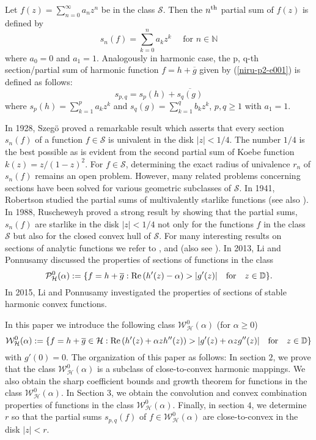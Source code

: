 \documentclass[a4paper,12pt]{amsart}
\theoremstyle{plain}
\theoremstyle{definition}
\begin{document}
Let  $f(z)=\sum_{n=0}^\infty a_nz^n$  be in the class $\mathcal{S}$. Then  the $n^{\rm th}$ partial sum of $f(z)$ is defined by
$$s_n(f)=\sum_{k=0}^n a_kz^k \quad\mbox { for } n\in\mathbb{N}
$$
where $a_0 = 0$ and $a_1 = 1$.
Analogously in harmonic case, the p, q-th section/partial sum of harmonic function $f = h + \overline{g}$ given by (\ref{niru-p2-e001}) is defined as follows:
$$
s_{p,q} = s_p(h) + \overline {s_q(g)}
$$
where $ s_p(h) =\sum_{k =1}^{p} a_k z^k$ and  $s_q(g) = \sum_{k = 1}^{q}{b_k z^k}$, $p,q \geq 1$ with $a_1 = 1.$

In 1928, Szeg\"o \cite{szego-1928} proved a remarkable result which asserts   that every section $s_n(f)$ of a function $f\in\mathcal{S}$ is univalent in the disk $|z|< 1/4$. The number $1/4$ is the best possible 
as is evident from the second partial sum of Koebe function $k(z) = z/ (1 - z)^2$. For $f\in \mathcal{S}$, determining the exact  radius of univalence $r_n$ of $s_n(f)$ remains an open problem. However, many  related problems concerning sections have been solved for various  geometric subclasses of $\mathcal{S}$.  In 1941, Robertson \cite{Robertson-1941} studied  the partial sums of multivalently starlike functions (see also \cite{Robertson-1936}). In 1988, Ruscheweyh \cite{Ruscheweyh-1988} proved a strong result by showing that the partial sums, $s_n(f)$  are starlike in the disk $|z|< 1/4$ not only for the functions $f$ in the class $\mathcal{S}$ but also for the closed convex hull of $\mathcal{S}$.  For many interesting results on sections of analytic functions
we refer to \cite{Obradovic-Ponnusamy-2013a}, \cite{Ponnusamy-Sahoo-Yanagihara-2014} and \cite{Silverman-1988} (also see \cite{Bharanedhar-Ponnusamy-2014, Obradovic-Ponnusamy-2014, Singh--1970}). 
In 2013, Li and Ponnusamy \cite{Ponnusamy-Li-2013} discussed the properties of sections of functions in the class
$$
 \mathcal{P}^{0}_{\mathcal{H}}(\alpha) := \{ f = h + \overline {g}: {\rm Re\,}(h'(z) - \alpha) > |g'(z)| \quad \mbox{for} \quad z \in \mathbb{D}\}.
$$
In 2015, Li and Ponnusamy \cite{Li-Ponnusamy-2015}
investigated the properties of sections of stable harmonic convex functions.

In this  paper we introduce the following class $\mathcal{W}^0_{\mathcal{H}}(\alpha)$ (for $\alpha \geq 0$)
 $$
 \mathcal{W}^0_{\mathcal{H}}(\alpha):= \{f = h + \overline{g}\in\mathcal{H}: {\rm Re\,}(h'(z) + \alpha z h''(z)) >|g'(z) + \alpha z g''(z)| \quad \mbox{for}\quad z\in \mathbb{D}\}
 $$
with  $g'(0)=0$.
The organization of this paper as follows: In section $2$, we  prove that the class $\mathcal{W}^0_{\mathcal{H}}(\alpha)$ is a subclass of close-to-convex harmonic mappings. We also obtain the sharp coefficient bounds and growth theorem for functions in the class $\mathcal{W}^0_{\mathcal{H}}(\alpha)$. In Section $3$, we obtain the convolution and convex combination properties of functions in the class $\mathcal{W}^0_{\mathcal{H}}(\alpha)$. Finally, in section $4$, we determine  $r$ so that the partial sums $s_{p, q}(f)$ of $f\in\mathcal{W}^0_{\mathcal{H}}(\alpha)$ are close-to-convex in the disk $|z|< r.$
\end{document}
